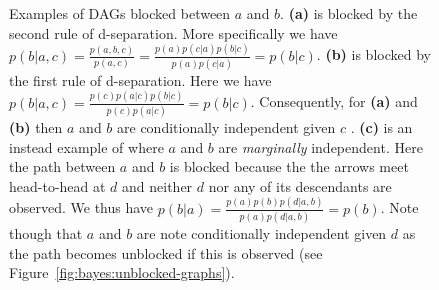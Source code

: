 \begin{figure}[t]
	\centering 
	\begin{subfigure}[t]{0.32\textwidth}
		\centering
		\resizebox{0.9\textwidth}{!}{
		}
		\caption{\label{fig:bayes:block1}}
	\end{subfigure}
	\begin{subfigure}[t]{0.32\textwidth}
		\centering
		\resizebox{0.9\textwidth}{!}{
		}
		\caption{\label{fig:bayes:block2}}
	\end{subfigure}
	\begin{subfigure}[t]{0.32\textwidth}
		\centering
		\resizebox{0.9\textwidth}{!}{
		}
		\caption{\label{fig:bayes:block3}}
	\end{subfigure}
	\caption{Examples of DAGs blocked between $a$ and $b$.  \textbf{(a)} is blocked
		by the second rule of d-separation.  More specifically we have 
		$p(b|a,c)=\frac{p(a,b,c)}{p(a,c)} = \frac{p(a)p(c|a)p(b|c)}{p(a)p(c|a)} = p(b|c)$.
		\textbf{(b)} is blocked by the first rule of d-separation.  Here we have
		$p(b|a,c)=\frac{p(c)p(a|c)p(b|c)}{p(c)p(a|c)} = p(b|c)$.  Consequently, for \textbf{(a)} 
		and \textbf{(b)} then $a$ and $b$ are conditionally independent given $c$ .
		\textbf{(c)} is an instead example of where $a$ and $b$ are \emph{marginally} independent.  Here
		the path between $a$ and $b$ is blocked because the the arrows meet head-to-head at 
		$d$ and neither $d$ nor any of its
		descendants are observed.  We thus have $p(b|a) = \frac{p(a)p(b)p(d|a,b)}{p(a)p(d|a,b)} = p(b)$.
		Note though that $a$ and $b$ are note conditionally independent given $d$ as
		the path becomes unblocked if this is observed (see Figure~\ref{fig:bayes:unblocked-graphs}).
		\label{fig:bayes:blocked-graphs}}
\end{figure}

